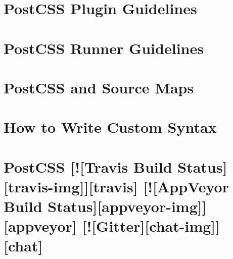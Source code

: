 \documentclass[twoside]{book}
\newcommand{\+}{\discretionary{\mbox{\scriptsize$\hookleftarrow$}}{}{}}
\begin{document}
\chapter{Post\+C\+SS Plugin Guidelines}
\label{md__c_1_workspace_demo_src_main_script_node_modules_postcss-modules-extract-imports_node_modules_postcss_docs_guidelines_plugin}

\chapter{Post\+C\+SS Runner Guidelines}
\label{md__c_1_workspace_demo_src_main_script_node_modules_postcss-modules-extract-imports_node_modules_postcss_docs_guidelines_runner}

\chapter{Post\+C\+SS and Source Maps}
\label{md__c_1_workspace_demo_src_main_script_node_modules_postcss-modules-extract-imports_node_modules_postcss_docs_source-maps}

\chapter{How to Write Custom Syntax}
\label{md__c_1_workspace_demo_src_main_script_node_modules_postcss-modules-extract-imports_node_modules_postcss_docs_syntax}

\chapter{Post\+C\+SS \mbox{[}!\mbox{[}Travis Build Status\mbox{]}\mbox{[}travis-\/img\mbox{]}\mbox{]}\mbox{[}travis\mbox{]} \mbox{[}!\mbox{[}App\+Veyor Build Status\mbox{]}\mbox{[}appveyor-\/img\mbox{]}\mbox{]}\mbox{[}appveyor\mbox{]} \mbox{[}!\mbox{[}Gitter\mbox{]}\mbox{[}chat-\/img\mbox{]}\mbox{]}\mbox{[}chat\mbox{]}}
\label{md__c_1_workspace_demo_src_main_script_node_modules_postcss-modules-extract-imports_node_modules_postcss__r_e_a_d_m_e}

\end{document}
